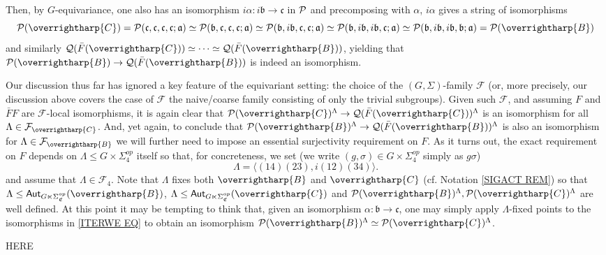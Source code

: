 \documentclass[a4paper,10pt
,draft
]{article}%
\renewcommand{\F}{\mathcal F}
\renewcommand{\1}{\eta}%
\newcommand{\vect}[1]{\text{\overrightharp{\ensuremath{#1}}}}
\begin{document}
\begin{example}
Then, by $G$-equivariance, one also has an isomorphism
$i\alpha \colon i\mathfrak{b} \to \mathfrak{c}$
in $\P$ and precomposing  
with $\alpha$, $i \alpha$ gives a string of isomorphisms
\begin{equation}\label{ITERWE EQ}
\P(\vect{C})
=
\P(\mathfrak{c},\mathfrak{c},\mathfrak{c},\mathfrak{c};\mathfrak{a})
\simeq 
\P(\mathfrak{b},\mathfrak{c},\mathfrak{c},\mathfrak{c};\mathfrak{a})
\simeq
\P(\mathfrak{b},i\mathfrak{b},\mathfrak{c},\mathfrak{c};\mathfrak{a})
\simeq
\P(\mathfrak{b},i\mathfrak{b},i\mathfrak{b},\mathfrak{c};\mathfrak{a})
\simeq
\P(\mathfrak{b},i\mathfrak{b},i\mathfrak{b},\mathfrak{b};\mathfrak{a})
=
\P(\vect{B})
\end{equation}
and similarly
$\mathcal{Q}(\bar{F}(\vect{C})) 
\simeq
\cdots 
\simeq
\mathcal{Q}(\bar{F}(\vect{B}))
$,
yielding that
$\P(\vect{B}) \to \mathcal{Q}(\bar{F}(\vect{B}))$
is indeed an isomorphism.

Our discussion thus far has ignored a key feature of the equivariant setting: the choice of the $(G,\Sigma)$-family $\F$
(or, more precisely, our discussion above covers the case of $\F$ the naive/coarse family consisting of only the trivial subgroups).
Given such $\F$, 
and assuming $F$ and $\bar{F} F$ are $\F$-local isomorphisms,
it is again clear that
$\P(\vect{C})^{\Lambda} \to \mathcal{Q}(\bar{F}(\vect{C}))^{\Lambda}$
is an isomorphism for all $\Lambda \in \F_{\vect{C}}$.
And, yet again, to conclude that
$\P(\vect{B})^{\Lambda} \to \mathcal{Q}(\bar{F}(\vect{B}))^{\Lambda}$
is also an isomorphism for $\Lambda \in \F_{\vect{B}}$ we will further need to impose an essential surjectivity requirement on $F$.
As it turns out, the exact requirement on $F$ depends on 
$\Lambda \leq G \times \Sigma_4^{op}$ itself so that, for concreteness, we set (we write $(g,\sigma) \in G \times \Sigma_4^{op}$ simply as $g\sigma$)
\[
\Lambda = \langle (14)(23), i (12)(34) \rangle.
\]
and assume that $\Lambda \in \F_4$.
Note that $\Lambda$ fixes both 
$\vect{B}$ and $\vect{C}$
(cf. Notation \ref{SIGACT REM})
so that 
$\Lambda \leq \mathsf{Aut}_{G \ltimes \Sigma^{op}_{\mathfrak{C}}}(\vect{B})$,
$\Lambda \leq \mathsf{Aut}_{G \ltimes \Sigma^{op}_{\mathfrak{C}}}(\vect{C})$
and $\P(\vect{B})^{\Lambda}, \P(\vect{C})^{\Lambda}$
are well defined.
At this point it may be tempting to think that, 
given an isomorphism 
$\alpha \colon \mathfrak{b} \to \mathfrak{c}$,
one may simply apply $\Lambda$-fixed points 
to the isomorphisms in \eqref{ITERWE EQ}
to obtain an isomorphism 
$\P(\vect{B})^{\Lambda} \simeq \P(\vect{C})^{\Lambda}$.



{\color{red} HERE}

\end{example}
\end{document}
